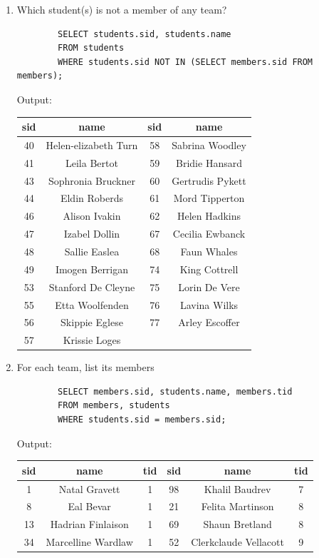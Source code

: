 \documentclass[11pt,letterpaper]{article}
\begin{document}
	\begin{enumerate}
		
		\item Which student(s) is not a member of any team?
		\begin{verbatim}
		SELECT students.sid, students.name
		FROM students
		WHERE students.sid NOT IN (SELECT members.sid FROM members);
		\end{verbatim}
		Output:
		\begin{center}
			\begin{tabular}{ | c  c | c  c | }
				\hline
				sid & name & sid & name\\
				\hline
				40 & Helen-elizabeth Turn & 58 & Sabrina Woodley \\
				41 & Leila Bertot & 59 & Bridie Hansard \\
				43 & Sophronia Bruckner & 60 & Gertrudis Pykett \\
				44 & Eldin Roberds & 61 & Mord Tipperton \\
				46 & Alison Ivakin & 62 & Helen Hadkins \\
				47 & Izabel Dollin & 67 & Cecilia Ewbanck \\
				48 & Sallie Easlea & 68 & Faun Whales \\
				49 & Imogen Berrigan & 74 & King Cottrell \\
				53 & Stanford De Cleyne & 75 & Lorin De Vere \\
				55 & Etta Woolfenden & 76 & Lavina Wilks \\
				56 & Skippie Eglese & 77 & Arley Escoffer \\
				57 & Krissie Loges &  & \\
				\hline
			\end{tabular}
		\end{center}
		
		\item For each team, list its members
		\begin{verbatim}
		SELECT members.sid, students.name, members.tid 
		FROM members, students 
		WHERE students.sid = members.sid;
		\end{verbatim}
		Output:
		\begin{center}
			\begin{tabular}{ | c  c  c |  c c c | }
				\hline
				sid & name & tid & sid & name & tid \\
				\hline
				1 & Natal Gravett & 1 & 98 & Khalil Baudrev & 7 \\
				8 & Eal Bevar & 1 & 21 & Felita Martinson & 8 \\
				13 & Hadrian Finlaison & 1 & 69 & Shaun Bretland & 8 \\
				34 & Marcelline Wardlaw & 1 & 52 & Clerkclaude Vellacott & 9 \\
				

\end{tabular}
\end{center}
\end{enumerate}
\end{document}
